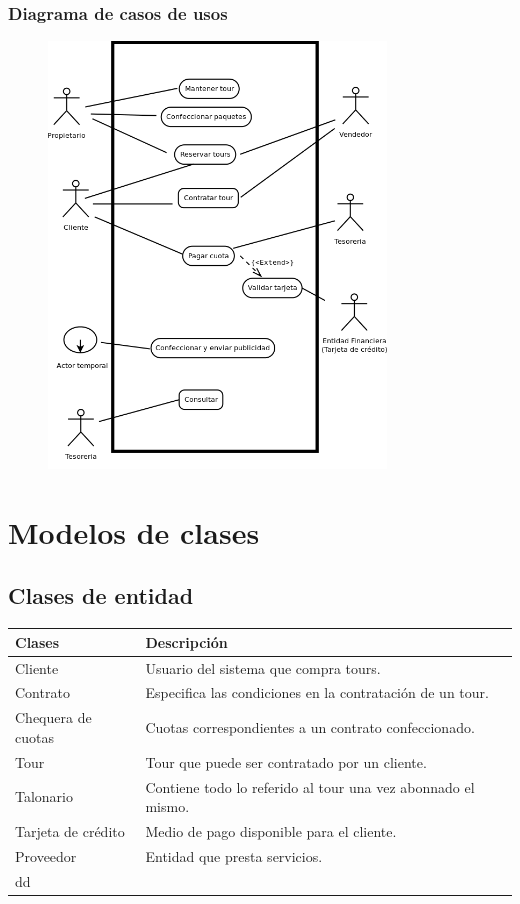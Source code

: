\documentclass[12pt,a4paper,titlepage,oneside]{article}
\begin{document}
\newpage

\subsubsection{Diagrama de casos de usos}
 
\begin{figure}[htb]
\centerline{\includegraphics[width=0.8\textwidth]{diagramaCasosDeUso}}
\label{fig:celda}
\end{figure}
 
 \newpage

\section{Modelos de clases}


\subsection{Clases de entidad}


\begin{tabular}{|l|l|}
\hline 
\textbf{Clases} & \textbf{Descripción} \\ 
\hline 
Cliente & Usuario del sistema que compra tours. \\ 
\hline 
Contrato & Especifica las condiciones en la contratación de un tour. \\ 
\hline 
Chequera de cuotas & Cuotas correspondientes a un contrato confeccionado. \\ 
\hline 
Tour & Tour que puede ser contratado por un cliente. \\ 
\hline 
Talonario & Contiene todo lo referido al tour una vez abonnado el mismo. \\ 
\hline 
Tarjeta de crédito &  Medio de pago disponible para el cliente.\\ 
\hline 
Proveedor & Entidad que presta servicios.\\ 
\hline dd
\end{tabular} 
\end{document}
